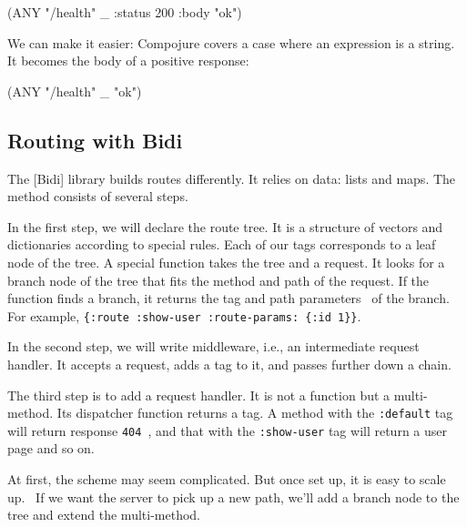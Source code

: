 \begin{english}
  \begin{clojure}
(ANY "/health" _ {:status 200 :body "ok"})
  \end{clojure}
\end{english}

\fi

We can make it easier: Compojure covers a case where an expression is a string. It becomes the body of a positive response:

\begin{english}
  \begin{clojure}
(ANY "/health" _ "ok")
  \end{clojure}
\end{english}

\subsection{Routing with Bidi}


The [Bidi] library builds routes differently. It relies on data: lists and maps. The method consists of several steps.

In the first step, we will declare the route tree. It is a structure of vectors and dictionaries according to special rules. Each of our tags corresponds to a leaf node of the tree. A special function takes the tree and a request. It looks for a branch node of the tree that fits the method and path of the request. If the function finds a branch, it returns the tag and path parameters  of the branch. For example, \verb|{:route :show-user :route-params: {:id 1}}|.


In the second step, we will write middleware, i.e., an intermediate request handler. It accepts a request, adds a tag to it, and passes further down a chain.

The third step is to add a request handler. It is not a function but a multi-method.
Its dispatcher function returns a tag. A method with the \verb|:default| tag will return response \verb|404 |, and that with the \verb|:show-user| tag will return a user page and so on.

At first, the scheme may seem complicated. But once set up, it is easy to scale up.  If we want the server to pick up a new path, we'll add a branch node to the tree and extend the multi-method.

